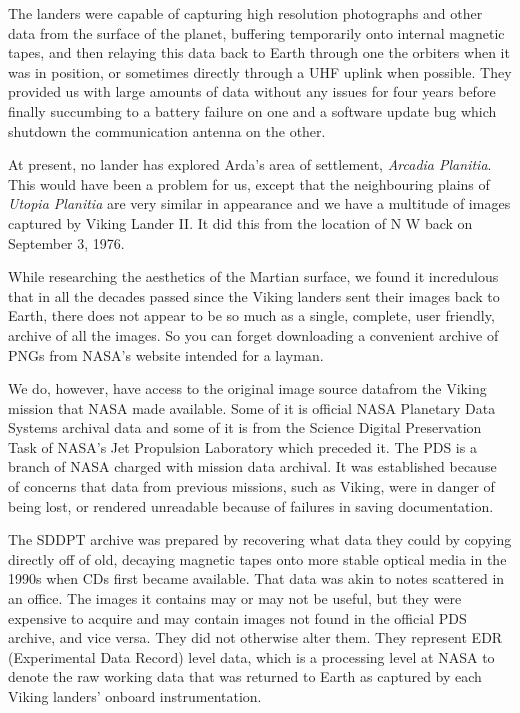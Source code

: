 The landers were capable of capturing high resolution photographs and other data from the surface of the planet, buffering temporarily onto internal magnetic tapes, and then relaying this data back to Earth through one the orbiters when it was in position, or sometimes directly through a UHF uplink when possible. They provided us with large amounts of data without any issues for four years before finally succumbing to a battery failure on one and a software update bug which shutdown the communication antenna on the other.

At present, no lander has explored Arda's area of settlement, {\it Arcadia Planitia}. This would have been a problem for us, except that the neighbouring plains of {\it Utopia Planitia} are very similar in appearance and we have a multitude of images captured by Viking Lander II. It did this from the location of N W back on September 3, 1976.

    {}


While researching the aesthetics of the Martian surface, we found it incredulous that in all the decades passed since the Viking landers sent their images back to Earth, there does not appear to be so much as a single, complete, user friendly, archive of all the images. So you can forget downloading a convenient archive of PNGs from NASA's website intended for a layman.

We do, however, have access to the original image source data from the Viking mission that NASA made available. Some of it is official NASA Planetary Data Systems archival data and some of it is from the Science Digital Preservation Task of NASA's Jet Propulsion Laboratory which preceded it. The PDS is a branch of NASA charged with mission data archival. It was established because of concerns that data from previous missions, such as Viking, were in danger of being lost, or rendered unreadable because of failures in saving documentation.

The SDDPT archive was prepared by recovering what data they could by copying directly off of old, decaying magnetic tapes onto more stable optical media in the 1990s when CDs first became available. That data was  akin to notes scattered in an office. The images it contains may or may not be useful, but they were expensive to acquire and may contain images not found in the official PDS archive, and vice versa. They did not otherwise alter them. They represent EDR (Experimental Data Record) level data, which is a processing level at NASA to denote the raw working data that was returned to Earth as captured by each Viking landers' onboard instrumentation.

